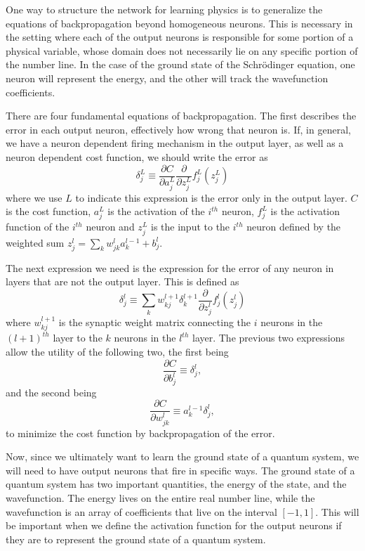One way to structure the network for learning physics is to generalize the
equations of backpropagation beyond homogeneous neurons. This is necessary in
the setting where each of the output neurons is responsible for some portion of
a physical variable, whose domain does not necessarily lie on any specific
portion of the number line. In the case of the ground state of the Schr\"{o}dinger 
equation, one neuron will represent the energy, and the other will track the 
wavefunction coefficients.

There are four fundamental equations of backpropagation. The first describes
the error in each output neuron, effectively how wrong that neuron is. If, in
general, we have a neuron dependent firing mechanism in the output layer, as
well as a neuron dependent cost function, we should write the error as 
\begin{equation}
	\delta^L_j 
	\equiv 
	\frac{\partial C}{\partial a^L_j} 
	\frac{\partial  }{\partial z^L_j}
	f^L_j(z^L_j)
\end{equation}
where we use $L$ to indicate this expression is the error only in the output
layer.  $C$ is the cost function, $a^L_j$ is the activation of the $i^{th}$
neuron, $f^L_j$ is the activation function of the $i^{th}$ neuron and $z^L_j$
is the input to the $i^{th}$ neuron defined by the weighted sum 
$z^l_j = \sum_k w^{l}_{jk} a^{l-1}_k + b^l_j$.

The next expression we need is the expression for the error of any neuron in
layers that are not the output layer. This is defined as 
\begin{equation}
	\delta^l_j
	\equiv
	\sum_k w^{l+1}_{kj} \delta^{l+1}_k
	\frac{\partial}{\partial z^l_j}
	f^l_j(z^l_j)
\end{equation}
where $w^{l+1}_{kj}$ is the synaptic weight matrix connecting the $i$ neurons
in the $(l+1)^{th}$ layer to the $k$ neurons in the $l^{th}$ layer. The
previous two expressions allow the utility of the following two, the first
being 
\begin{equation}
	\frac{\partial C}{\partial b^l_j} \equiv \delta^l_j,
\end{equation}
and the second being
\begin{equation}
	\frac{\partial C}{\partial w^{l}_{jk}} \equiv a^{l-1}_k \delta^l_j,
\end{equation}
to minimize the cost function by backpropagation of the error.

Now, since we ultimately want to learn the ground state of a quantum system, we
will need to have output neurons that fire in specific ways. The ground state
of a quantum system has two important quantities, the energy of the state, and
the wavefunction. The energy lives on the entire real number line, while the
wavefunction is an array of coefficients that live on the interval $[-1,1]$. This 
will be important when we define the activation function for the output neurons 
if they are to represent the ground state of a quantum system.

